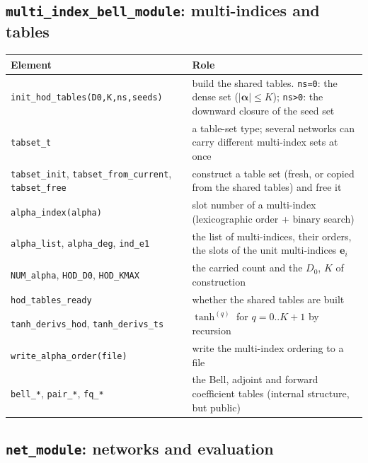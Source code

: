 \documentclass[10pt,a4paper]{article}
\newcommand{\code}[1]{\texttt{#1}}
\newcommand{\mi}[1]{\boldsymbol{#1}}
\begin{document}
\subsection{\code{multi\_index\_bell\_module}: multi-indices and tables}

\begin{longtable}{@{}p{}p{}@{}}
\toprule
Element & Role \\
\midrule
\endhead
\code{init\_hod\_tables(D0,K,ns,seeds)} & build the shared tables. \code{ns=0}: the dense set ($|\mi\alpha|\le K$); \code{ns>0}: the downward closure of the seed set\\
\code{tabset\_t} & a table-set type; several networks can carry different multi-index sets at once\\
\code{tabset\_init}, \code{tabset\_from\_current}, \code{tabset\_free} & construct a table set (fresh, or copied from the shared tables) and free it\\
\code{alpha\_index(alpha)} & slot number of a multi-index (lexicographic order + binary search)\\
\code{alpha\_list}, \code{alpha\_deg}, \code{ind\_e1} & the list of multi-indices, their orders, the slots of the unit multi-indices $\mi{e}_i$\\
\code{NUM\_alpha}, \code{HOD\_D0}, \code{HOD\_KMAX} & the carried count and the $D_0$, $K$ of construction\\
\code{hod\_tables\_ready} & whether the shared tables are built\\
\code{tanh\_derivs\_hod}, \code{tanh\_derivs\_ts} & $\tanh^{(q)}$ for $q=0..K{+}1$ by recursion\\
\code{write\_alpha\_order(file)} & write the multi-index ordering to a file\\
\code{bell\_*}, \code{pair\_*}, \code{fq\_*} & the Bell, adjoint and forward coefficient tables (internal structure, but public)\\
\bottomrule
\end{longtable}

\subsection{\code{net\_module}: networks and evaluation}
\end{document}
